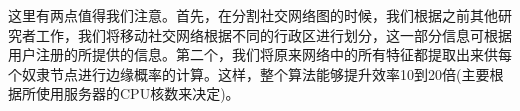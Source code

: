 这里有两点值得我们注意。首先，在分割社交网络图的时候，我们根据之前其他研究者工作，我们将移动社交网络根据不同的行政区进行划分，这一部分信息可根据用户注册的所提供的信息。第二个，我们将原来网络中的所有特征都提取出来供每个奴隶节点进行边缘概率的计算。这样，整个算法能够提升效率10到20倍(主要根据所使用服务器的CPU核数来决定)。































